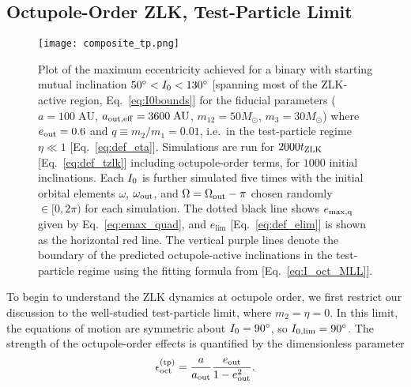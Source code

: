 \documentclass[
        fleqn,
        usenatbib,
    ]{mnras}
\newlength{\colummwidth}
\begin{document}
\subsection{Octupole-Order ZLK, Test-Particle Limit}

\begin{figure}
    \centering
    \texttt{[image: composite\_tp.png]}
    \caption{Plot of the maximum eccentricity achieved for a binary with
    starting mutual inclination $50^\circ < I_{\rm 0} < 130^\circ$ [spanning
    most of the ZLK-active region, Eq.~\eqref{eq:I0bounds}] for the fiducial
    parameters ($a = 100\;\mathrm{AU}$, $a_{\rm out, eff} = 3600\;\mathrm{AU}$,
    $m_{12} = 50M_{\odot}$, $m_3 = 30M_{\odot}$) where $e_{\rm out} = 0.6$ and
    $q \equiv m_2 / m_1 = 0.01$, i.e.\ in the test-particle regime $\eta \ll 1$
    [Eq.~\eqref{eq:def_eta}]. Simulations are run for $2000t_{\rm ZLK}$
    [Eq.~\eqref{eq:def_tzlk}] including octupole-order terms, for $1000$ initial
    inclinations. Each $I_{\rm 0}$ is further simulated five times with the
    initial orbital elements $\omega$, $\omega_{\rm out}$, and $\Omega =
    \Omega_{\rm out} - \pi$ chosen randomly $\in [0, 2\pi)$ %
    for each simulation. The dotted black line shows $e_{\rm \max, q}$ given by
    Eq.~\eqref{eq:emax_quad}, and $e_{\lim}$ [Eq.~\eqref{eq:def_elim}] is shown
    as the horizontal red line. The vertical purple lines denote the boundary of
    the predicted octupole-active inclinations in the test-particle regime using
    the fitting formula from \citet{MLL16} [Eq.~\eqref{eq:I_oct_MLL}].
    }\label{fig:composite_tp}
\end{figure}

To begin to understand the ZLK dynamics at octupole order, we first restrict our
discussion to the well-studied test-particle limit, where $m_2 = \eta = 0$. In
this limit, the equations of motion are symmetric about $I_{\rm 0} = 90^\circ$,
so $I_{\rm 0, \lim} = 90^\circ$. The strength of the octupole-order effects is
quantified by the dimensionless parameter \citep{katz2011long,
lithwick2011eccentric, naoz2012formation}
\begin{equation}
    \epsilon_{\rm oct}^{\rm (tp)} = \frac{a}{a_{\rm
        out}} \frac{e_{\rm out}}{1 - e_{\rm out}^2}.\label{eq:eps_oct_tp}
\end{equation}
\end{document}
